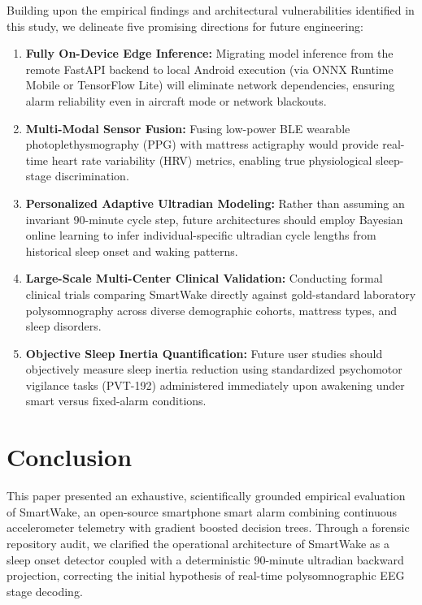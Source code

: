 \documentclass[journal,11pt,onecolumn]{IEEEtran}
\begin{document}
Building upon the empirical findings and architectural vulnerabilities identified in this study, we delineate five promising directions for future engineering:
\begin{enumerate}[leftmargin=*]
    \item \textbf{Fully On-Device Edge Inference:} Migrating model inference from the remote FastAPI backend to local Android execution (via ONNX Runtime Mobile or TensorFlow Lite) will eliminate network dependencies, ensuring alarm reliability even in aircraft mode or network blackouts.
    \item \textbf{Multi-Modal Sensor Fusion:} Fusing low-power BLE wearable photoplethysmography (PPG) with mattress actigraphy would provide real-time heart rate variability (HRV) metrics, enabling true physiological sleep-stage discrimination.
    \item \textbf{Personalized Adaptive Ultradian Modeling:} Rather than assuming an invariant 90-minute cycle step, future architectures should employ Bayesian online learning to infer individual-specific ultradian cycle lengths from historical sleep onset and waking patterns.
    \item \textbf{Large-Scale Multi-Center Clinical Validation:} Conducting formal clinical trials comparing SmartWake directly against gold-standard laboratory polysomnography across diverse demographic cohorts, mattress types, and sleep disorders.
    \item \textbf{Objective Sleep Inertia Quantification:} Future user studies should objectively measure sleep inertia reduction using standardized psychomotor vigilance tasks (PVT-192) administered immediately upon awakening under smart versus fixed-alarm conditions.
\end{enumerate}

\section{Conclusion}
\label{sec:conclusion}\hypertarget{sec:conclusion}{}

This paper presented an exhaustive, scientifically grounded empirical evaluation of SmartWake, an open-source smartphone smart alarm combining continuous accelerometer telemetry with gradient boosted decision trees. Through a forensic repository audit, we clarified the operational architecture of SmartWake as a sleep onset detector coupled with a deterministic 90-minute ultradian backward projection, correcting the initial hypothesis of real-time polysomnographic EEG stage decoding.
\end{document}
